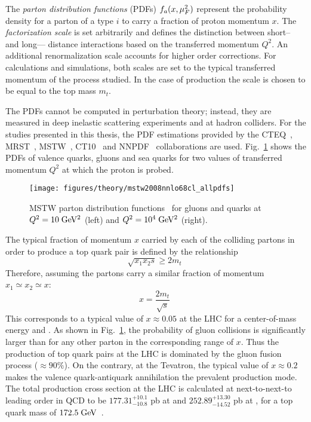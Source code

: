 The {\it parton distribution functions} (PDFs) $f_a(x,\mu_F^2{})$
represent the probability density for a parton of a type $i$ to carry
a fraction of proton momentum $x$. The {\it factorization scale}
\factscale{} is set arbitrarily and defines the distinction between
short-- and long--- distance interactions based on the transferred momentum
$Q^2$. An additional renormalization scale \renormscale{} accounts for higher
order corrections. For calculations and simulations, both scales are
set to the typical transferred momentum of the process studied. In the case of
\ttbar{} production the scale is chosen to be equal to the top mass $m_t$.
  
The PDFs cannot be computed in perturbation theory; instead, they are
measured in deep inelastic scattering experiments and at hadron colliders.
For the studies presented in this thesis, the PDF estimations
provided by the CTEQ~\cite{cteq6}, MRST~\cite{mrst}, MSTW~\cite{mstw}, CT10~\cite{ct10}
and NNPDF~\cite{nnpdf} collaborations are used. Fig.~\ref{fig:pdfs}
shows the PDFs of valence quarks, gluons and sea quarks for two values
of transferred momentum $Q^2$ at which the proton is probed. 

\begin{figure}[!htb]\centering
  \texttt{[image: figures/theory/mstw2008nnlo68cl\_allpdfs]}
  \caption{MSTW parton distribution functions~\cite{ct10} for gluons
    and quarks at $Q^2=10\; \mathrm{GeV}{}^2$ (left) and $Q^2=10^4\; \mathrm{GeV}{}^2$ (right).}
  \label{fig:pdfs}
\end{figure}

The typical fraction of momentum $x$ carried by each of the colliding
partons in order to produce a top quark pair is defined by the
relationship
\begin{equation}
\sqrt{x_1x_2s}\geq{}2m_t\phantom{.}
\end{equation}
Therefore, assuming the partons carry a similar fraction of momentum
$x_1\simeq{}x_2\simeq{}x$:
\begin{equation}
x=\frac{2m_t}{\sqrt{s}}
\phantom{.}
\end{equation}
This corresponds to a typical value of $x\approx{}0.05$ at the LHC for
a center-of-mass energy \seventev{} and \eighttev{}. As shown in
Fig.~\ref{fig:pdfs}, the probability of gluon collisions is
significantly larger than for any other parton in the corresponding
range of $x$. Thus the production of top quark pairs at the LHC is
dominated by the gluon fusion process ($\approx{}90\%$). On the
contrary, at the Tevatron, the typical value of $x\approx{}0.2$ makes
the valence quark-antiquark annihilation the prevalent \ttbar{}
production mode.
The total \ttbar{} production cross section at the LHC is calculated
at next-to-next-to leading order in
QCD to be
$177.31^{+10.1}_{-10.8}$ pb at \seventev{} and
$252.89^{+13.30}_{-14.52}$ pb at \eighttev{}, for a top quark mass of
$172.5 \; \mathrm{GeV}{}$~\cite{ttxs1,ttxs2,ttxs3,ttxs4,ttxs5,ttxs6,ttxs7}.
 

